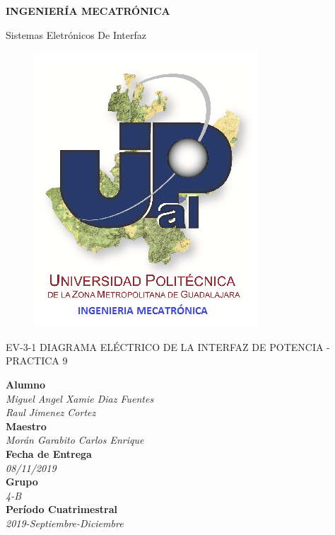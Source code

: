 \documentclass[11pt,a4paper]{article}
\author{Miguel Angel Xamie Diaz Fuentes}
\begin{document}
\begin{center}
\begin{LARGE}
\textbf{INGENIERÍA MECATRÓNICA}\\
\end{LARGE}
{\large Sistemas Eletrónicos De Interfaz}\\

\begin{figure}[hbtp]
\centering
\includegraphics[scale=0.80]{UPZMG_Mecatr_nica.png}
\end{figure} 

\begin{center}
\begin{LARGE}
EV-3-1 DIAGRAMA ELÉCTRICO DE LA INTERFAZ DE POTENCIA - PRACTICA 9
\end{LARGE}
\end{center}

\begin{Large}
\textbf{Alumno}
\\\textit{Miguel Angel Xamie Diaz Fuentes\\Raul Jimenez Cortez}
\textbf{\\Maestro}
\\\textit{Morán Garabito Carlos Enrique}
\textbf{\\Fecha de Entrega}
\\\textit{08/11/2019}
\textbf{\\Grupo}
\\\textit{4-B}\\
\textbf{Período Cuatrimestral}\\
\textit{2019-Septiembre-Diciembre}
\\
\end{Large}

\end{center}
\end{document}
